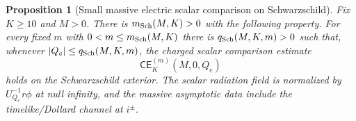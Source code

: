 \documentclass[11pt]{article}
\numberwithin{equation}{section}
\theoremstyle{plain}
\newtheorem{proposition}[theorem]{Proposition}
\theoremstyle{definition}
\theoremstyle{remark}
\newcommand{\CElec}{\mathsf{CE}}
\begin{document}
\begin{proposition}[Small massive electric scalar comparison on Schwarzschild]\label{prop:schwarzschild-small-mass-charge-condition}
Fix \(K\ge10\) and \(M>0\).  There is \(m_{\rm Sch}(M,K)>0\) with the following property.  For every fixed \(m\) with \(0<m\le m_{\rm Sch}(M,K)\) there is \(q_{\rm Sch}(M,K,m)>0\) such that, whenever \(|Q_e|\le q_{\rm Sch}(M,K,m)\), the charged scalar comparison estimate
\begin{equation}\label{eq:sch-small-ce-condition}
 \CElec_K^{(m)}(M,0,Q_e)
\end{equation}
holds on the Schwarzschild exterior.  The scalar radiation field is normalized by \(U_{Q_e}^{-1}r\phi\) at null infinity, and the massive asymptotic data include the timelike/Dollard channel at \(i^\pm\).
\end{proposition}
\end{document}
